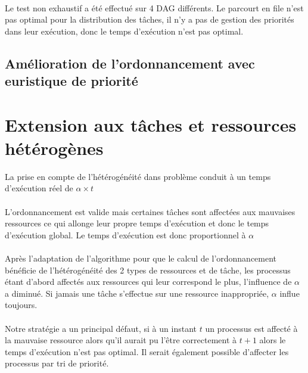 \documentclass[11pt]{article}
\begin{document}
\paragraph{}
Le test non exhaustif a été effectué sur 4 DAG différents. Le parcourt en file n'est pas optimal pour la distribution des tâches, il n'y a pas de gestion des priorités dans leur exécution, donc le temps d’exécution n'est pas optimal.

\subsection{Amélioration de l'ordonnancement avec euristique de priorité}


\section{Extension aux tâches et ressources hétérogènes}
La prise en compte de l’hétérogénéité dans problème conduit à un temps d’exécution réel de $\alpha \times t$

\paragraph{}
L'ordonnancement est valide mais certaines tâches sont affectées aux mauvaises ressources ce qui allonge leur propre temps d’exécution et donc le temps d’exécution global. Le temps d’exécution est donc proportionnel à $\alpha$  

\paragraph{}
Après l'adaptation de l'algorithme pour que le calcul de l’ordonnancement bénéficie de l’hétérogénéité des 2 types de ressources et de tâche, les processus étant d'abord affectés aux ressources qui leur correspond le plus, l'influence de $\alpha$ a diminué. Si jamais une tâche s'effectue sur une ressource inappropriée, $\alpha$ influe toujours.

\paragraph{}
Notre stratégie a un principal défaut, si à un instant $t$ un processus est affecté à la mauvaise ressource alors qu'il aurait pu l'être correctement à $t+1$ alors le temps d'exécution n'est pas optimal. Il serait également possible d'affecter les processus par tri de priorité. 
\end{document}
